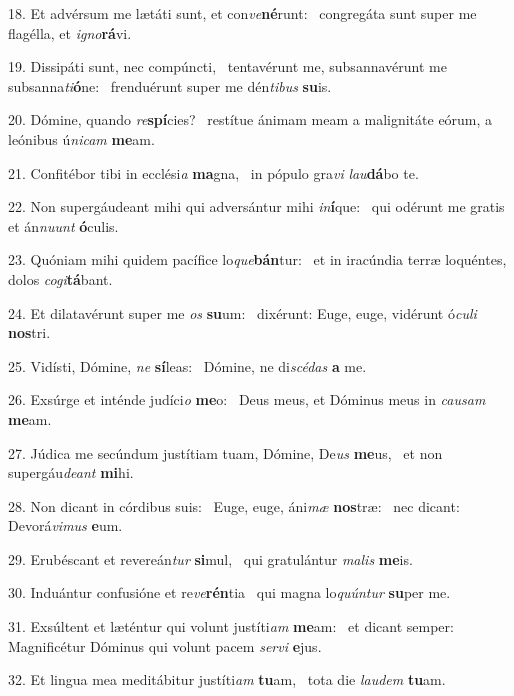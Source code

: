 18. Et advérsum me lætáti sunt, et con\textit{ve}\textbf{né}runt: \ast\  congregáta sunt super me flagélla, et \textit{i}\textit{gno}\textbf{rá}vi.\

19. Dissipáti sunt, nec compúncti, \dag\  tentavérunt me, subsannavérunt me subsanna\textit{ti}\textbf{ó}ne: \ast\  frenduérunt super me dén\textit{ti}\textit{bus} \textbf{su}is.\

20. Dómine, quando \textit{re}\textbf{spí}cies? \ast\  restítue ánimam meam a malignitáte eórum, a leónibus ú\textit{ni}\textit{cam} \textbf{me}am.\

21. Confitébor tibi in ecclési\textit{a} \textbf{ma}gna, \ast\  in pópulo gra\textit{vi} \textit{lau}\textbf{dá}bo te.\

22. Non supergáudeant mihi qui adversántur mihi \textit{in}\textbf{í}que: \ast\  qui odérunt me gratis et án\textit{nu}\textit{unt} \textbf{ó}culis.\

23. Quóniam mihi quidem pacífice lo\textit{que}\textbf{bán}tur: \ast\  et in iracúndia terræ loquéntes, dolos \textit{co}\textit{gi}\textbf{tá}bant.\

24. Et dilatavérunt super me \textit{os} \textbf{su}um: \ast\  dixérunt: Euge, euge, vidérunt ó\textit{cu}\textit{li} \textbf{nos}tri.\

25. Vidísti, Dómine, \textit{ne} \textbf{sí}leas: \ast\  Dómine, ne di\textit{scé}\textit{das} \textbf{a} me.\

26. Exsúrge et inténde judíci\textit{o} \textbf{me}o: \ast\  Deus meus, et Dóminus meus in \textit{cau}\textit{sam} \textbf{me}am.\

27. Júdica me secúndum justítiam tuam, Dómine, De\textit{us} \textbf{me}us, \ast\  et non supergáu\textit{de}\textit{ant} \textbf{mi}hi.\

28. Non dicant in córdibus suis: \dag\  Euge, euge, áni\textit{mæ} \textbf{nos}træ: \ast\  nec dicant: Devorá\textit{vi}\textit{mus} \textbf{e}um.\

29. Erubéscant et revereán\textit{tur} \textbf{si}mul, \ast\  qui gratulántur \textit{ma}\textit{lis} \textbf{me}is.\

30. Induántur confusióne et re\textit{ve}\textbf{rén}tia \ast\  qui magna lo\textit{quún}\textit{tur} \textbf{su}per me.\

31. Exsúltent et læténtur qui volunt justíti\textit{am} \textbf{me}am: \ast\  et dicant semper: Magnificétur Dóminus qui volunt pacem \textit{ser}\textit{vi} \textbf{e}jus.\

32. Et lingua mea meditábitur justíti\textit{am} \textbf{tu}am, \ast\  tota die \textit{lau}\textit{dem} \textbf{tu}am.\

